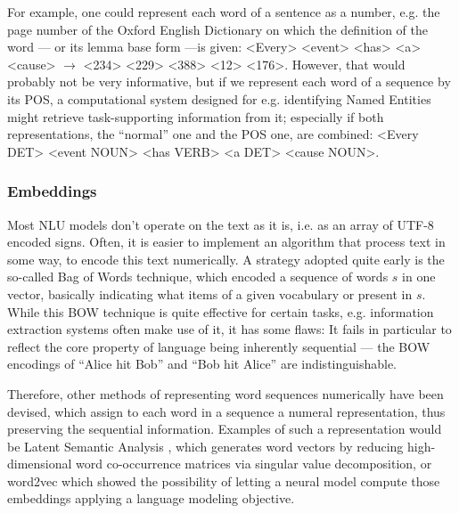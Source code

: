 For example, one could represent each word of a sentence as a number, e.g. the page number of the
Oxford English Dictionary on which the definition of the word --- or its lemma base form ---is
given: <Every> <event> <has> <a> <cause> $\rightarrow$ <234> <229> <388> <12> <176>. However, that
would probably not be very informative, but if we represent each word of a sequence by its POS, a
computational system designed for e.g. identifying Named Entities might retrieve task-supporting
information from it; especially if both representations, the ``normal'' one and the POS one, are
combined: <Every DET> <event NOUN> <has VERB> <a DET> <cause NOUN>.


\subsubsection*{Embeddings}


Most NLU models don't operate on the text as it is, i.e. as an array of UTF-8 encoded
signs. Often, it is easier to implement an algorithm that process text in some way, to
encode this text numerically. A strategy adopted quite early is the so-called Bag of
Words \citep{harris1954distributional} technique, which encoded a sequence of words $s$
in one vector, basically indicating what items of a given vocabulary or present in $s$.
While this BOW technique is quite effective for certain tasks, e.g. information extraction
systems often make use of it, it has some flaws: It fails in particular to reflect the core
property of language being inherently sequential --- the BOW encodings of ``Alice hit Bob''
and ``Bob hit Alice'' are indistinguishable.

Therefore, other methods of representing word sequences numerically have been devised, which assign
to each word in a sequence a numeral representation, thus preserving the sequential information.
Examples of such a representation would be Latent Semantic Analysis \citep{furnas1988using}, which
generates word vectors by reducing high-dimensional word co-occurrence matrices via singular value
decomposition, or word2vec \citep{mikolov2013distributed} which showed the possibility of letting a
neural model compute those embeddings applying a language modeling objective.



